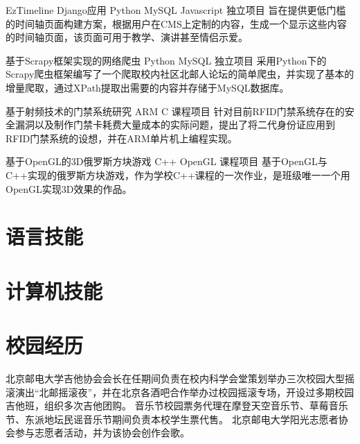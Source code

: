 \documentclass[11pt,a4paper]{moderncv}
\begin{document}
{EzTimeline}
{Django应用 Python MySQL Javascript}
{独立项目}{}
{旨在提供更低门槛的时间轴页面构建方案，根据用户在CMS上定制的内容，生成一个显示这些内容的时间轴页面，该页面可用于教学、演讲甚至情侣示爱。}

{基于Scrapy框架实现的网络爬虫}
{Python MySQL}
{独立项目}{}
{采用Python下的Scrapy爬虫框架编写了一个爬取校内社区北邮人论坛的简单爬虫，并实现了基本的增量爬取，通过XPath提取出需要的内容并存储于MySQL数据库。}

{基于射频技术的门禁系统研究}
{ARM C}
{课程项目}{}
{针对目前RFID门禁系统存在的安全漏洞以及制作门禁卡耗费大量成本的实际问题，提出了将二代身份证应用到RFID门禁系统的设想，并在ARM单片机上编程实现。}

{基于OpenGL的3D俄罗斯方块游戏}
{C++ OpenGL}
{课程项目}{}
{基于OpenGL与C++实现的俄罗斯方块游戏，作为学校C++课程的一次作业，是班级唯一一个用OpenGL实现3D效果的作品。}

\section{语言技能}

\section{计算机技能}


\section{校园经历} %
{北京邮电大学吉他协会会长}{}{}{}{在任期间负责在校内科学会堂策划举办三次校园大型摇滚演出“北邮摇滚夜”，并在北京各酒吧合作举办过校园摇滚专场，开设过多期校园吉他班，组织多次吉他团购。}
{音乐节校园票务代理}{}{}{}{在摩登天空音乐节、草莓音乐节、东派地坛民谣音乐节期间负责本校学生票代售。}
{北京邮电大学阳光志愿者协会}{}{}{}{参与志愿者活动，并为该协会创作会歌。}

\closesection{}                   %
\renewcommand{\listitemsymbol}{-} %

\nocite{*}


\end{document}
